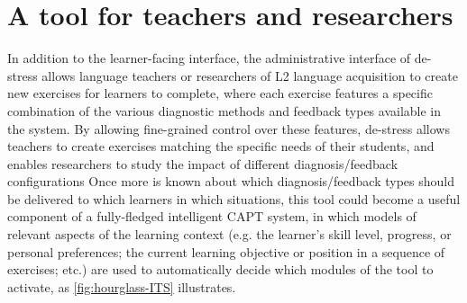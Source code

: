 \documentclass[a4paper]{article}
\newcommand{\TODO}[1]{{\color{red}\textbf{[TODO #1]}}}
\begin{document}
\section{A tool for teachers and researchers}
In addition to the learner-facing interface, 
the administrative interface of de-stress allows
language teachers or researchers of L2 language acquisition 
to
create new exercises for learners to complete, where each exercise features a specific combination of the various diagnostic methods and feedback types available in the system. By allowing fine-grained control over these features, de-stress allows teachers to create exercises matching the specific needs of their students, and enables researchers to study the 
impact of
different diagnosis/feedback configurations
%
%
%
%
Once more is known about which diagnosis/feedback types should be delivered to which learners in which situations, this tool could become a useful component of a fully-fledged intelligent CAPT system, in which 
models of relevant aspects of the learning context (e.g. the learner's skill level, progress, or personal preferences; the current learning objective or position in a sequence of exercises; etc.)
are used to automatically decide which modules of the tool to activate, as \cref{fig:hourglass-ITS} illustrates.
\end{document}
